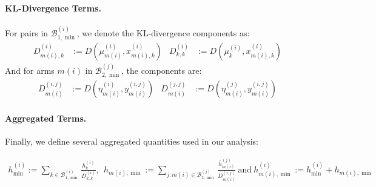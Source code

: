\documentclass{article}
\begin{document}
\paragraph{KL-Divergence Terms.} For pairs in $\mathcal{B}^{(i)}_{1,\min}$, we denote the KL-divergence components as:
\begin{align*}
    D^{(i)}_{m(i),k} &:= D(\mu^{(i)}_{m(i)},x^{(i)}_{m(i),k}) & D^{(i)}_{k,k} &:= D(\mu^{(i)}_{k},x^{(i)}_{m(i),k})
\end{align*}
And for arms $m(i)$ in $\mathcal{B}^{(j)}_{2,\min}$, the components are:
\begin{align*}
    D^{(i,j)}_{m(i)} &:= D(\eta^{(i)}_{m(i)},y^{(i,j)}_{m(i)}) & D^{(j,j)}_{m(i)} &:= D(\eta^{(j)}_{m(i)},y^{(i,j)}_{m(i)})
\end{align*}

\paragraph{Aggregated Terms.} Finally, we define several aggregated quantities used in our analysis:

\begin{align*}
     h^{(i)}_{\min} := \sum_{k\in\mathcal{B}^{(i)}_{1,\min}}\frac{h^{(i)}_{k}}{D^{(i)}_{k,k}},\ \   h_{m(i),\min} := \sum_{j:m(i)\in\mathcal{B}^{(j)}_{2,\min}}\frac{\bar{h}^{(j)}_{m(i)}}{D^{(i,j)}_{m(i)}} \ \text{and}\    h^{(i)}_{m(i),\min} := h^{(i)}_{\min}+h_{m(i),\min}
\end{align*}
\end{document}

